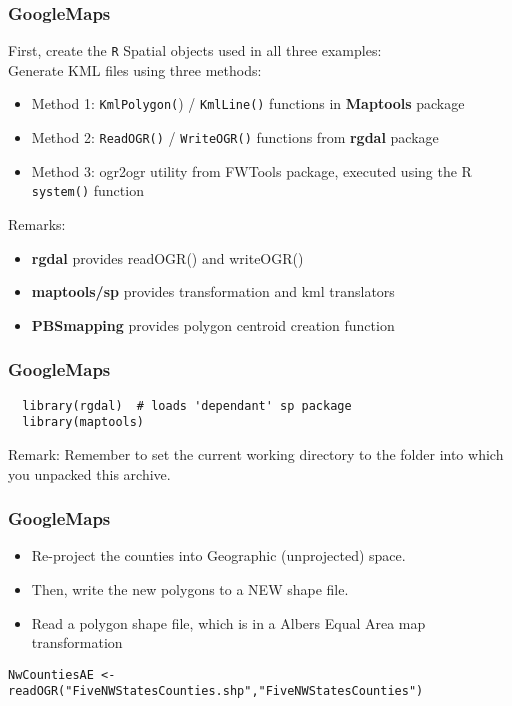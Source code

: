 \documentclass{beamer}
\begin{document}
\begin{frame}[fragile]
\frametitle{GoogleMaps}
First, create the \texttt{R} Spatial objects used in all three examples:\\

Generate KML files using three methods: 
\begin{itemize}
\item Method 1: \texttt{KmlPolygon(}) / \texttt{KmlLine()} functions in \textbf{Maptools} package
\item Method 2: \texttt{ReadOGR()} / \texttt{WriteOGR()} functions from \textbf{rgdal} package
\item Method 3: ogr2ogr utility from FWTools package, executed using the R \texttt{system()} function                     
\end{itemize}
Remarks:
\begin{itemize} 
\item \textbf{rgdal }provides readOGR() and writeOGR()
\item \textbf{maptools/sp} provides transformation and kml translators
\item \textbf{PBSmapping} provides polygon centroid creation function
\end{itemize}


\end{frame}
\begin{frame}[fragile]
\frametitle{GoogleMaps}
\begin{framed}
\begin{verbatim}
  library(rgdal)  # loads 'dependant' sp package
  library(maptools)
\end{verbatim}
\end{framed}
Remark: Remember to set the current working directory to the folder into which you unpacked this archive.

\end{frame}
\begin{frame}[fragile]
\frametitle{GoogleMaps}



\begin{itemize}
\item Re-project the counties into Geographic (unprojected) space.
\item Then, write the new polygons to a NEW shape file.
\item Read a polygon shape file, which is in a Albers Equal Area map transformation
\end{itemize} 
\begin{verbatim}
NwCountiesAE <- readOGR("FiveNWStatesCounties.shp","FiveNWStatesCounties")  
\end{verbatim}
\end{frame}
\end{document}
